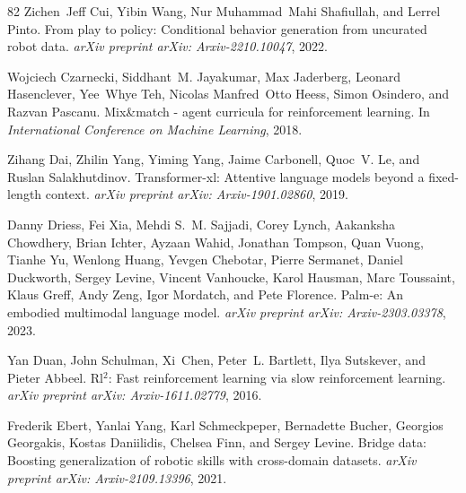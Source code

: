 \documentclass{article}
\begin{document}
\begin{thebibliography}{82}
Zichen~Jeff Cui, Yibin Wang, Nur Muhammad~Mahi Shafiullah, and Lerrel Pinto.
\newblock From play to policy: Conditional behavior generation from uncurated robot data.
\newblock \emph{arXiv preprint arXiv: Arxiv-2210.10047}, 2022.

Wojciech Czarnecki, Siddhant~M. Jayakumar, Max Jaderberg, Leonard Hasenclever, Yee~Whye Teh, Nicolas Manfred~Otto Heess, Simon Osindero, and Razvan Pascanu.
\newblock Mix\&match - agent curricula for reinforcement learning.
\newblock In \emph{International Conference on Machine Learning}, 2018.

Zihang Dai, Zhilin Yang, Yiming Yang, Jaime Carbonell, Quoc~V. Le, and Ruslan Salakhutdinov.
\newblock Transformer-xl: Attentive language models beyond a fixed-length context.
\newblock \emph{arXiv preprint arXiv: Arxiv-1901.02860}, 2019.

Danny Driess, Fei Xia, Mehdi S.~M. Sajjadi, Corey Lynch, Aakanksha Chowdhery, Brian Ichter, Ayzaan Wahid, Jonathan Tompson, Quan Vuong, Tianhe Yu, Wenlong Huang, Yevgen Chebotar, Pierre Sermanet, Daniel Duckworth, Sergey Levine, Vincent Vanhoucke, Karol Hausman, Marc Toussaint, Klaus Greff, Andy Zeng, Igor Mordatch, and Pete Florence.
\newblock Palm-e: An embodied multimodal language model.
\newblock \emph{arXiv preprint arXiv: Arxiv-2303.03378}, 2023.

Yan Duan, John Schulman, Xi~Chen, Peter~L. Bartlett, Ilya Sutskever, and Pieter Abbeel.
\newblock Rl$^2$: Fast reinforcement learning via slow reinforcement learning.
\newblock \emph{arXiv preprint arXiv: Arxiv-1611.02779}, 2016.

Frederik Ebert, Yanlai Yang, Karl Schmeckpeper, Bernadette Bucher, Georgios Georgakis, Kostas Daniilidis, Chelsea Finn, and Sergey Levine.
\newblock Bridge data: Boosting generalization of robotic skills with cross-domain datasets.
\newblock \emph{arXiv preprint arXiv: Arxiv-2109.13396}, 2021.


\end{thebibliography}
\end{document}
